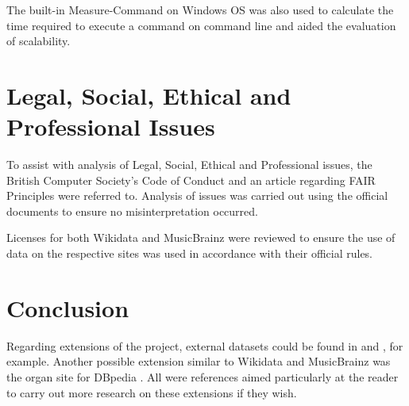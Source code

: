 The built-in Measure-Command \cite{measurecommand} on Windows OS was also used to calculate the time required to execute a command on command line and aided the evaluation of scalability. 

\section{Legal, Social, Ethical and Professional Issues}
\hspace{0.5cm} To assist with analysis of Legal, Social, Ethical and Professional issues, the British Computer Society's Code of Conduct \cite{bcs} and an article regarding FAIR Principles \cite{fairprinciples} were referred to. Analysis of issues was carried out using the official documents to ensure no misinterpretation occurred. 

Licenses for both Wikidata \cite{wikidatalicense} and MusicBrainz \cite{musicbrainzlicense} were reviewed to ensure the use of data on the respective sites was used in accordance with their official rules. 

\section{Conclusion}
\hspace{0.5cm} Regarding extensions of the project, external datasets could be found in \cite{kaggle} and \cite{googledatasetsearch}, for example. Another possible extension similar to Wikidata and MusicBrainz was the organ site for DBpedia \cite{organdbpedia}. All were references aimed particularly at the reader to carry out more research on these extensions if they wish. 

